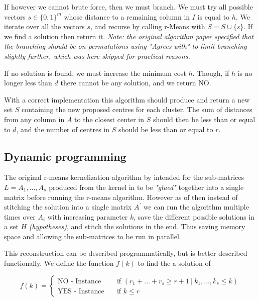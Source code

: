 \documentclass[a4paper]{article}
\begin{document}
If however we cannot brute force, then we must branch. We must try all possible vectors $s \in \{0,1\}^m$ whose distance to a remaining column in $I$
is equal to $h$. We iterate over all the vectors $s$, and recurse by calling r-Means with $S= S\cup\{s\}$. If we find a solution then return it.
\textit{Note: the original algorithm paper \cite{fomin_golovach_panolan_2020} specified that the branching should be on permutations using "Agrees with"
    to limit branching slightly further, which was here skipped for practical reasons.}

If no solution is found, we must increase the minimum cost $h$. Though, if $h$ is no longer less than $d$ there cannot be any solution, and we return NO.



With a correct implementation this algorithm should produce and return a new set $S$ containing the new proposed
centres for each cluster. The sum of distances from any column in $A$ to the closest center in $S$ should then be
less than or equal to $d$, and the number of centres in $S$ should be less than or equal to $r$.

\subsection{Dynamic programming}
\label{sec:algo:dynamic-result}
The original r-means kernelization algorithm by \cite{fomin_golovach_panolan_2020}
intended for the sub-matrices $L=A_1,\dots,A_s$ produced from the kernel in  to be \textit{"glued"} together
into a single matrix before running the r-means algorithm. However as of  then instead of stitching the solution
into a single matrix $A^\prime$ we can run the algorithm multiple times over $A_i$ with increasing parameter $k$,
save the different possible solutions in a set $H$ \textit{(hypotheses)}, and stitch the solutions in the end. Thus saving
memory space and allowing the sub-matrices to be run in parallel.

This reconstruction can be described programmatically, but is better described functionally. We define the function $f(k)$ to find
the a solution of

\[ f(k) =
    \begin{cases}
        \text{NO - Instance}  & \quad \text{if } (r_1 + \hdots + r_s \geq r+1 ~|~ k_1, \hdots, k_s \leq k) \\
        \text{YES - Instance} & \quad \text{if } k \leq r
    \end{cases}
\]
\end{document}
